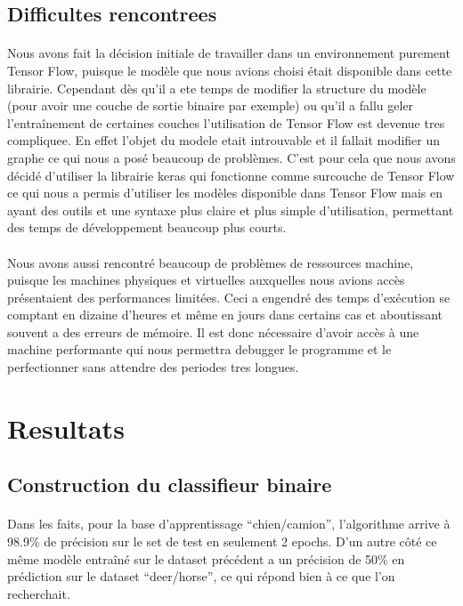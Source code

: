 \documentclass[11 pt]{article}
\begin{document}
\subsection{Difficultes rencontrees}
\paragraph{}Nous avons fait la décision initiale de travailler dans un environnement purement Tensor Flow, puisque le modèle que nous avions choisi était disponible dans cette librairie. Cependant dès qu’il a ete temps de modifier la structure du modèle (pour avoir une couche de sortie binaire par exemple) ou qu’il a fallu geler l'entraînement de certaines couches l’utilisation de Tensor Flow est devenue tres compliquee. En effet l’objet du modele etait introuvable et il fallait modifier un graphe ce qui nous a posé beaucoup de problèmes. C’est pour cela que nous avons décidé d’utiliser la librairie keras qui fonctionne comme surcouche de Tensor Flow ce qui nous a permis d’utiliser les modèles disponible dans Tensor Flow mais en ayant des outils et une syntaxe plus claire et plus simple d’utilisation, permettant des temps de développement beaucoup plus courts.

\paragraph{}Nous avons aussi rencontré beaucoup de problèmes de ressources machine, puisque les machines physiques et virtuelles auxquelles nous avions accès présentaient des performances limitées. Ceci a engendré des temps d'exécution se comptant en dizaine d’heures et même en jours dans certains cas et aboutissant souvent a des erreurs de mémoire. Il est donc nécessaire d’avoir accès à une machine performante qui nous permettra debugger le programme et le perfectionner sans attendre des periodes tres longues. 


\section{Resultats}
\subsection{Construction du classifieur binaire}
\paragraph{}Dans les faits, pour la base d’apprentissage “chien/camion”, l’algorithme arrive à 98.9\% de précision sur le set de test en seulement 2 epochs. D’un autre côté ce même modèle entraîné sur le dataset précédent a un précision de 50\% en prédiction sur le dataset “deer/horse”, ce qui répond bien à ce que l’on recherchait.
\end{document}
